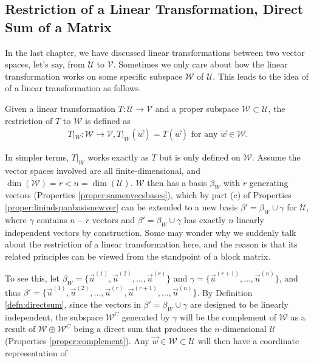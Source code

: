 \subsection{Restriction of a Linear Transformation, Direct Sum of a Matrix}
In the last chapter, we have discussed linear transformations between two vector spaces, let's say, from $\mathcal{U}$ to $\mathcal{V}$. Sometimes we only care about how the linear transformation works on some specific subspace $\mathcal{W}$ of $\mathcal{U}$. This leads to the idea of  of a linear transformation as follows.
\begin{defn}
\label{defn:restrictionTW}
Given a linear transformation $T: \mathcal{U} \to \mathcal{V}$ and a proper subspace $\mathcal{W} \subset \mathcal{U}$, the restriction of $T$ to $\mathcal{W}$ is defined as
\begin{align*}
T|_W: \mathcal{W} \to \mathcal{V}, T|_W(\vec{w}) = T(\vec{w}) \text{ for any $\vec{w} \in \mathcal{W}$.}
\end{align*}
\end{defn}
In simpler terms, $T|_W$ works exactly as $T$ but is only defined on $\mathcal{W}$. Assume the vector spaces involved are all finite-dimensional, and $\dim(\mathcal{W}) = r < n = \dim(\mathcal{U})$. $\mathcal{W}$ then has a basis $\mathcal{\beta}_W$ with $r$ generating vectors (Properties \ref{proper:samenvecsbases}), which by part (c) of Properties \ref{proper:linindspanbasisnewver} can be extended to a new basis $\mathcal{\beta}' = \mathcal{\beta}_W \cup \mathcal{\gamma}$ for $\mathcal{U}$, where $\mathcal{\gamma}$ contains $n - r$ vectors and $\mathcal{\beta}' = \mathcal{\beta}_W \cup \mathcal{\gamma}$ has exactly $n$ linearly independent vectors by construction. Some may wonder why we suddenly talk about the restriction of a linear transformation here, and the reason is that its related principles can be viewed from the standpoint of a block matrix.\par
To see this, let $\mathcal{\beta}_W = \{\vec{u}^{(1)}, \vec{u}^{(2)}, \ldots, \vec{u}^{(r)}\}$ and $\mathcal{\gamma} = \{\vec{u}^{(r+1)}, \ldots, \vec{u}^{(n)}\}$, and thus $\mathcal{\beta}' = \{\vec{u}^{(1)}, \vec{u}^{(2)}, \ldots, \vec{u}^{(r)}, \vec{u}^{(r+1)}, \ldots, \vec{u}^{(n)}\}$. By Definition \ref{defn:directsum}, since the vectors in $\mathcal{\beta}' = \mathcal{\beta}_W \cup \mathcal{\gamma}$ are designed to be linearly independent, the subspace $\mathcal{W}^C$ generated by $\mathcal{\gamma}$ will be the complement of $\mathcal{W}$ as a result of $\mathcal{W} \oplus \mathcal{W}^C$ being a direct sum that produces the $n$-dimensional $\mathcal{U}$ (Properties \ref{proper:complement}). Any $\vec{w} \in \mathcal{W} \subset \mathcal{U}$ will then have a coordinate representation of
